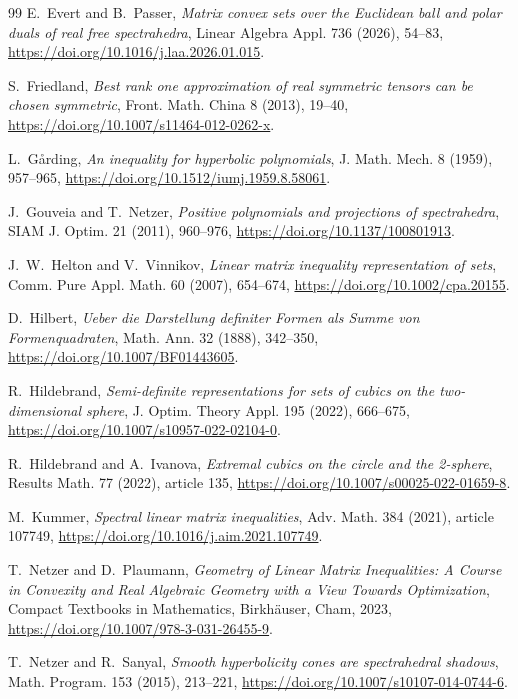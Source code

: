\documentclass[11pt,onecolumn]{article}
\theoremstyle{blueplain}
\theoremstyle{bluedefinition}
\theoremstyle{bluedefinition}
\begin{document}
\begin{thebibliography}{99}
E.~Evert and B.~Passer,
\emph{Matrix convex sets over the Euclidean ball and polar duals of real free spectrahedra},
Linear Algebra Appl. 736 (2026), 54--83,
\url{https://doi.org/10.1016/j.laa.2026.01.015}.

S.~Friedland,
\emph{Best rank one approximation of real symmetric tensors can be chosen symmetric},
Front. Math. China 8 (2013), 19--40,
\url{https://doi.org/10.1007/s11464-012-0262-x}.

L.~G\aa rding,
\emph{An inequality for hyperbolic polynomials},
J. Math. Mech. 8 (1959), 957--965,
\url{https://doi.org/10.1512/iumj.1959.8.58061}.

J.~Gouveia and T.~Netzer,
\emph{Positive polynomials and projections of spectrahedra},
SIAM J. Optim. 21 (2011), 960--976,
\url{https://doi.org/10.1137/100801913}.

J.~W.~Helton and V.~Vinnikov,
\emph{Linear matrix inequality representation of sets},
Comm. Pure Appl. Math. 60 (2007), 654--674,
\url{https://doi.org/10.1002/cpa.20155}.

D.~Hilbert,
\emph{Ueber die Darstellung definiter Formen als Summe von Formenquadraten},
Math. Ann. 32 (1888), 342--350,
\url{https://doi.org/10.1007/BF01443605}.

R.~Hildebrand,
\emph{Semi-definite representations for sets of cubics on the two-dimensional sphere},
J. Optim. Theory Appl. 195 (2022), 666--675,
\url{https://doi.org/10.1007/s10957-022-02104-0}.

R.~Hildebrand and A.~Ivanova,
\emph{Extremal cubics on the circle and the 2-sphere},
Results Math. 77 (2022), article 135,
\url{https://doi.org/10.1007/s00025-022-01659-8}.

M.~Kummer,
\emph{Spectral linear matrix inequalities},
Adv. Math. 384 (2021), article 107749,
\url{https://doi.org/10.1016/j.aim.2021.107749}.

T.~Netzer and D.~Plaumann,
\emph{Geometry of Linear Matrix Inequalities: A Course in Convexity and
Real Algebraic Geometry with a View Towards Optimization},
Compact Textbooks in Mathematics,
Birkh\"auser, Cham, 2023,
\url{https://doi.org/10.1007/978-3-031-26455-9}.

T.~Netzer and R.~Sanyal,
\emph{Smooth hyperbolicity cones are spectrahedral shadows},
Math. Program. 153 (2015), 213--221,
\url{https://doi.org/10.1007/s10107-014-0744-6}.


\end{thebibliography}
\end{document}
